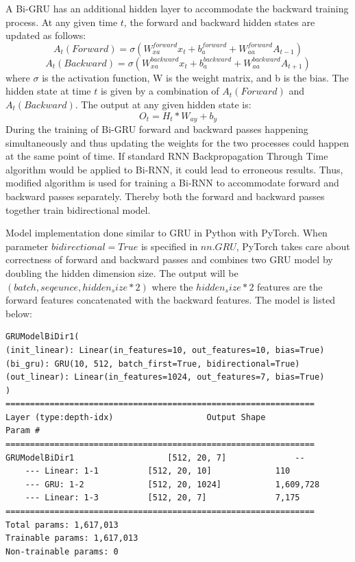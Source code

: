 A Bi-GRU has an additional hidden layer to accommodate the backward training process. At any given time 
$t$, the forward and backward hidden states are updated as follows:
\begin{equation}
A_t(Forward) = \sigma (W_{xa}^{forward}x_t + b_{a}^{forward} + W_{aa}^{forward}A_{t-1})
\end{equation}
\begin{equation}
A_t(Backward) = \sigma (W_{xa}^{backward}x_t + b_{a}^{backward} + W_{aa}^{backward}A_{t+1})
\end{equation}
where 
$\sigma$ is the activation function, W is the weight matrix, and b is the bias. The hidden state at time $t$ is given by a combination of $A_t(Forward)$ and $A_t(Backward)$. The output at any given hidden state is:
\begin{equation}
O_t = H_t * W_{ay} + b_y
\end{equation}
During the training of Bi-GRU forward and backward passes happening simultaneously and thus updating the weights for the two processes could happen at the same point of time. If standard RNN Backpropagation Through Time algorithm would be applied to Bi-RNN, it could lead to erroneous results. Thus, modified algorithm is used for training a Bi-RNN to accommodate forward and backward passes separately. Thereby both the forward and backward passes together train bidirectional model. 

Model implementation done similar to GRU in Python with PyTorch. When parameter $bidirectional=True$ is specified in $nn.GRU$, PyTorch takes care about correctness of forward and backward passes and combines two GRU model by doubling the hidden dimension size. The output will be $(batch, seqeunce, hidden_size * 2)$ where the $hidden_size * 2$ features are the forward features concatenated with the backward features. The model is listed below: 
\begin{lstlisting}[caption={Bidirectional GRU Model},captionpos=b]
GRUModelBiDir1(
(init_linear): Linear(in_features=10, out_features=10, bias=True)
(bi_gru): GRU(10, 512, batch_first=True, bidirectional=True)
(out_linear): Linear(in_features=1024, out_features=7, bias=True)
)
===============================================================
Layer (type:depth-idx)                   Output Shape              Param #
===============================================================
GRUModelBiDir1                   [512, 20, 7]              --
	--- Linear: 1-1          [512, 20, 10]             110
	--- GRU: 1-2             [512, 20, 1024]           1,609,728
	--- Linear: 1-3          [512, 20, 7]              7,175
===============================================================
Total params: 1,617,013
Trainable params: 1,617,013
Non-trainable params: 0
\end{lstlisting}

